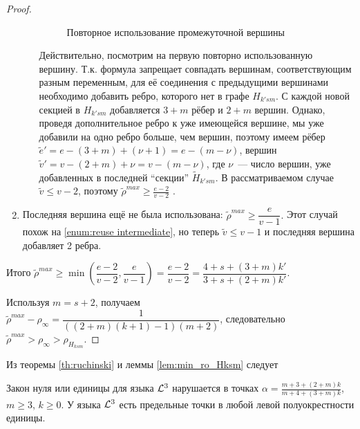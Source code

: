 \begin{proof}
\begin{enumerate}
\begin{enumerate}
\begin{figure}
  \caption{Повторное использование промежуточной вершины}
  \label{fig:reuse intermediate}
\end{figure}
\label{enum:reuse intermediate}
Действительно, посмотрим на первую повторно использованную вершину.
Т.к. формула запрещает совпадать вершинам, соответствующим разным переменным, для её соединения с предыдущими вершинами необходимо добавить ребро, которого нет в графе $H_{k'sm}$. 
С каждой новой секцией в $H_{k'sm}$ добавляется $3+m$ рёбер  и $2+m$ вершин.
Однако, проведя дополнительное ребро к уже имеющейся вершине, мы уже добавили на одно ребро больше, чем вершин, поэтому имеем рёбер $ \tilde e' = e - (3+m) + (\nu+1) = e - (m-\nu) $, вершин $\tilde v' = v - (2+m) + \nu = v - (m-\nu)$, где $\nu$~--- число вершин, уже добавленных в последней ``секции'' $\tilde H_{k'sm}$.
В рассматриваемом случае $\tilde v \leq v-2$, поэтому $\tilde \rho^{max} \geq \frac{e-2}{v-2}$ .
\end{enumerate}
\item
Последняя вершина ещё не была использована:
$\tilde \rho^{max} \geq \dfrac{e}{v-1}.$
Этот случай похож на \ref{enum:reuse intermediate}, но теперь $\tilde v \leq v-1$ и последняя вершина добавляет 2 ребра.
\end{enumerate}

Итого 
$\tilde \rho^{max} \geq \min(\dfrac{e-2}{v-2}, \dfrac{e}{v-1}) = \dfrac{e-2}{v-2} = \dfrac{4+s +(3+m)k'}{3+s + (2+m)k'}$. 

Используя $m=s+2$, получаем $\tilde \rho^{max} - \rho_\infty = \dfrac{1}{((2+m)(k+1)-1)(m+2)}$, следовательно
$\tilde \rho^{max} > \rho_\infty > \rho_{H_{ksm}} $.
\end{proof}

Из теоремы \ref{th:ruchinski} и леммы \ref{lem:min_ro_Hksm} следует

\begin{theorem}
 Закон нуля или единицы для языка $\mathcal{L}^3$ нарушается в точках $\alpha = \frac{m+3 + (2+m)k}{m+4 + (3+m)k}$, $m \geq 3$, $k \geq 0$.
У языка $\mathcal{L}^3$ есть предельные точки в любой левой полуокрестности единицы.
\end{theorem}